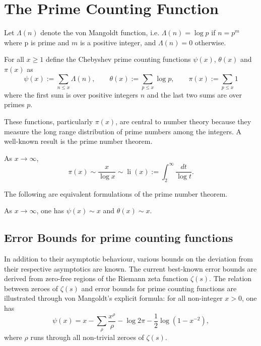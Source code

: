 \chapter{The Prime Counting Function}
\label{chap:prime_counting_function}

\unintegrated

Let $\Lambda(n)$ denote the von Mangoldt function, i.e. $\Lambda(n) = \log p$ if $n = p^m$ where p is prime and $m$ is a positive integer, and $\Lambda(n) = 0$ otherwise. 

\begin{definition}
For all $x \ge 1$ define the Chebyshev prime counting functions $\psi(x)$, $\theta(x)$ and $\pi(x)$ as
\[
\psi(x) := \sum_{n \le x}\Lambda(n),\qquad \theta(x) := \sum_{p \le x}\log p,\qquad \pi(x) := \sum_{p \le x}1
\]
where the first sum is over positive integers $n$ and the last two sums are over primes $p$.
\end{definition}

These functions, particularly $\pi(x)$, are central to number theory because they measure the long range distribution of prime numbers among the integers. A well-known result is the prime number theorem.

\begin{theorem}
As $x \to \infty$, 
\[
\pi(x) \sim \frac{x}{\log x} \sim \operatorname{li}(x) := \int_2^{\infty}\frac{dt}{\log t}.
\]
\end{theorem}

The following are equivalent formulations of the prime number theorem.

\begin{theorem}
As $x \to \infty$, one has $\psi(x) \sim x$ and $\theta(x) \sim x$.
\end{theorem}

\section{Error Bounds for prime counting functions}
In addition to their asymptotic behaviour, various bounds on the deviation from their respective asymptotics are known. The current best-known error bounds are derived from zero-free regions of the Riemann zeta function $\zeta(s)$. The relation between zeroes of $\zeta(s)$ and error bounds for prime counting functions are illustrated through von Mangoldt's explicit formula: for all non-integer $x > 0$, one has
\[
\psi(x) = x - \sum_{\rho}\frac{x^\rho}{\rho} - \log 2\pi - \frac{1}{2}\log(1 - x^{-2}),
\]
where $\rho$ runs through all non-trivial zeroes of $\zeta(s)$.

